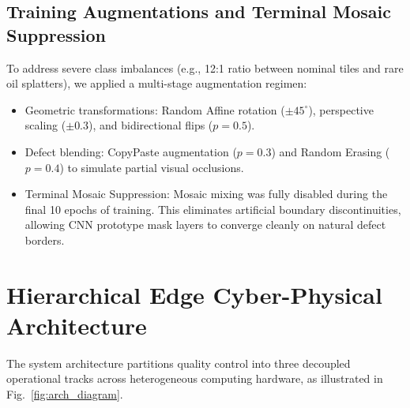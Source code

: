 \documentclass[conference]{IEEEtran}
\begin{document}
\subsection{Training Augmentations and Terminal Mosaic Suppression}
To address severe class imbalances (e.g., 12:1 ratio between nominal tiles and rare oil splatters), we applied a multi-stage augmentation regimen:
\begin{itemize}
    \item Geometric transformations: Random Affine rotation ($\pm 45^\circ$), perspective scaling ($\pm 0.3$), and bidirectional flips ($p=0.5$).
    \item Defect blending: CopyPaste augmentation ($p=0.3$) and Random Erasing ($p=0.4$) to simulate partial visual occlusions.
    \item Terminal Mosaic Suppression: Mosaic mixing was fully disabled during the final 10 epochs of training. This eliminates artificial boundary discontinuities, allowing CNN prototype mask layers to converge cleanly on natural defect borders.
\end{itemize}

\section{Hierarchical Edge Cyber-Physical Architecture}

The system architecture partitions quality control into three decoupled operational tracks across heterogeneous computing hardware, as illustrated in Fig.~\ref{fig:arch_diagram}.
\end{document}

